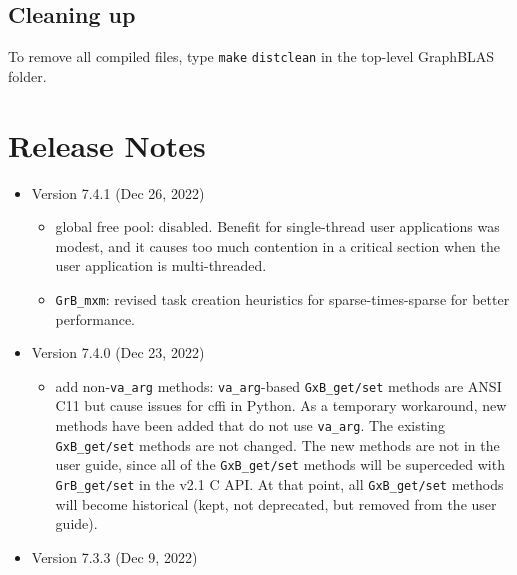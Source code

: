 \documentclass[12pt]{article}
\begin{document}
\subsection{Cleaning up}

To remove all compiled files, type \verb'make' \verb'distclean' in the top-level
GraphBLAS folder.

\section{Release Notes}

\begin{itemize}

\item Version 7.4.1 (Dec 26, 2022)

    \begin{itemize}
    \item global free pool: disabled.  Benefit for single-thread user
        applications was modest, and it causes too much contention in a
        critical section when the user application is multi-threaded.
    \item \verb'GrB_mxm': revised task creation heuristics for
        sparse-times-sparse for better performance.
    \end{itemize}

\item Version 7.4.0 (Dec 23, 2022)

    \begin{itemize}
    \item add non-\verb'va_arg' methods: \verb'va_arg'-based \verb'GxB_get/set'
        methods are ANSI C11 but cause issues for cffi in Python.  As a
        temporary workaround, new methods have been added that do not use
        \verb'va_arg'.  The existing \verb'GxB_get/set' methods are not
        changed.  The new methods are not in the user guide, since all of the
        \verb'GxB_get/set' methods will be superceded with \verb'GrB_get/set'
        in the v2.1 C API.  At that point, all \verb'GxB_get/set' methods will
        become historical (kept, not deprecated, but removed from the user
        guide).
    \end{itemize}

\item Version 7.3.3 (Dec 9, 2022)


\end{itemize}
\end{document}
